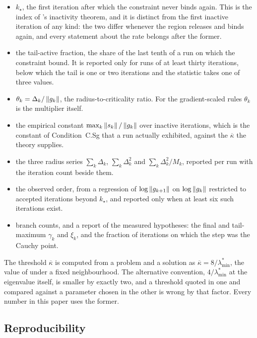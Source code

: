 \documentclass[11pt]{article}
\theoremstyle{plain}
\theoremstyle{definition}
\theoremstyle{remark}
\numberwithin{equation}{section}
\providecommand{\kbar}{\overline{\kappa}}
\providecommand{\kbar}{\overline{\kappa}}
\begin{document}
\begin{itemize}[leftmargin=1.6em, itemsep=2pt]
  \item $k_\star$, the first iteration after which the constraint never binds
        again. This is the index of \PartII's inactivity theorem, and it is
        distinct from the first inactive iteration of any kind: the two differ
        whenever the region releases and binds again, and every statement about
        the rate belongs after the former.
  \item the tail-active fraction, the share of the last tenth of a run on which
        the constraint bound. It is reported only for runs of at least thirty
        iterations, below which the tail is one or two iterations and the
        statistic takes one of three values.
  \item $\theta_k = \Delta_k/\left \lVert g_k \right \rVert$, the radius-to-criticality ratio. For
        the gradient-scaled rules $\theta_k$ is the multiplier itself.
  \item the empirical constant $\max_k \left \lVert s_k \right \rVert/\left \lVert g_k \right \rVert$ over inactive
        iterations, which is the constant of Condition~C.Sg that a run actually
        exhibited, against the $\kbar$ the theory supplies.
  \item the three radius series $\sum_k\Delta_k$, $\sum_k\Delta_k^2$ and
        $\sum_k \Delta_k^2/M_k$, reported per run with the iteration count beside
        them.
  \item the observed order, from a regression of $\log\left \lVert g_{k+1} \right \rVert$ on
        $\log\left \lVert g_k \right \rVert$ restricted to accepted iterations beyond $k_\star$, and
        reported only when at least six such iterations exist.
  \item branch counts, and a report of the measured hypotheses: the final and
        tail-maximum $\gamma_k$ and $\xi_k$, and the fraction of iterations on
        which the step was the Cauchy point.
\end{itemize}

The threshold $\kbar$ is computed from a problem and a solution as
$\kbar = 8/\lambda^*_{\min}$, the value of \PartII{} under a fixed neighbourhood.
The alternative convention, $4/\lambda^*_{\min}$ at the eigenvalue itself, is
smaller by exactly two, and a threshold quoted in one and compared against a
parameter chosen in the other is wrong by that factor. Every number in this paper
uses the former.

\subsection{Reproducibility}
\label{sec: reproducibility}
\end{document}
